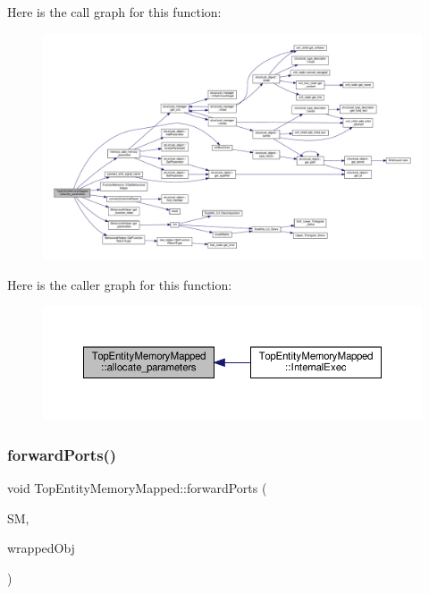 Here is the call graph for this function\+:
\nopagebreak
\begin{figure}[H]
\begin{center}
\leavevmode
\includegraphics[width=350pt]{d1/db6/classTopEntityMemoryMapped_a2fb8c5cf2248bf65c531ab60929d4b97_cgraph}
\end{center}
\end{figure}
Here is the caller graph for this function\+:
\nopagebreak
\begin{figure}[H]
\begin{center}
\leavevmode
\includegraphics[width=350pt]{d1/db6/classTopEntityMemoryMapped_a2fb8c5cf2248bf65c531ab60929d4b97_icgraph}
\end{center}
\end{figure}
\mbox{\label{classTopEntityMemoryMapped_acc4023b68af0f08214713a9ec209086d}} 
\subsubsection{\texorpdfstring{forward\+Ports()}{forwardPorts()}}
{\footnotesize\ttfamily void Top\+Entity\+Memory\+Mapped\+::forward\+Ports (\begin{DoxyParamCaption}\item[{\hyperlink{structural__manager_8hpp_ab3136f0e785d8535f8d252a7b53db5b5}{structural\+\_\+manager\+Ref}}]{SM,  }\item[{\hyperlink{structural__objects_8hpp_a8ea5f8cc50ab8f4c31e2751074ff60b2}{structural\+\_\+object\+Ref}}]{wrapped\+Obj }\end{DoxyParamCaption})\hspace{0.3cm}{\ttfamily [private]}}



